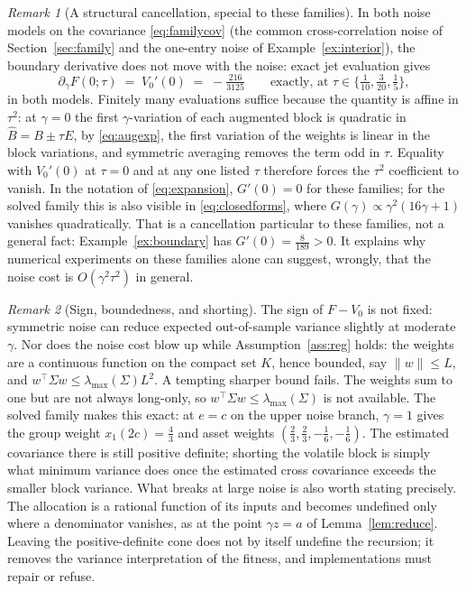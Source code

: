 \documentclass[11pt]{article}
\theoremstyle{remark}
\newtheorem{remark}{Remark}
\begin{document}
\begin{remark}[A structural cancellation, special to these families]
\label{rem:cancel}
In both noise models on the covariance \eqref{eq:familycov} (the common
cross-correlation noise of Section~\ref{sec:family} and the one-entry noise
of Example~\ref{ex:interior}), the boundary derivative does not move with
the noise: exact jet evaluation gives
\[
  \partial_\gamma F(0;\tau) \;=\; V_0'(0) \;=\; -\tfrac{216}{3125}
  \qquad\text{exactly, at } \tau \in \{\tfrac{1}{10}, \tfrac{3}{20},
  \tfrac15\},
\]
in both models. Finitely many evaluations suffice because the quantity is
affine in $\tau^2$: at $\gamma = 0$ the first $\gamma$-variation of each
augmented block is quadratic in $\widehat B = B \pm \tau E$, by
\eqref{eq:augexp}, the first variation of the weights is linear in the
block variations, and symmetric averaging removes the term odd in $\tau$.
Equality with $V_0'(0)$ at $\tau = 0$ and at any one listed $\tau$
therefore forces the $\tau^2$ coefficient to vanish. In the notation of
\eqref{eq:expansion}, $G'(0) = 0$ for
these families; for the solved family this is also visible in
\eqref{eq:closedforms}, where $G(\gamma) \propto \gamma^2(16\gamma+1)$
vanishes quadratically. That is a cancellation particular to these
families, not a general fact: Example~\ref{ex:boundary} has
$G'(0) = \tfrac{8}{189} > 0$. It explains why numerical experiments on
these families alone can suggest, wrongly, that the noise cost is
$O(\gamma^2\tau^2)$ in general.
\end{remark}

\begin{remark}[Sign, boundedness, and shorting]
\label{rem:bounded}
The sign of $F - V_0$ is not fixed: symmetric noise can reduce expected
out-of-sample variance slightly at moderate $\gamma$. Nor does the noise
cost blow up while Assumption~\ref{ass:reg} holds: the weights are a
continuous function on the compact set $K$, hence bounded, say
$\|w\| \le L$, and $w^\top \Sigma w \le \lambda_{\max}(\Sigma) L^2$. A
tempting sharper bound fails. The weights sum to one but are not always
long-only, so $w^\top \Sigma w \le \lambda_{\max}(\Sigma)$ is not
available. The solved family makes this exact: at $e = c$ on the upper
noise branch, $\gamma = 1$ gives the group weight $x_1(2c) = \tfrac43$ and
asset weights $(\tfrac23, \tfrac23, -\tfrac16, -\tfrac16)$. The estimated
covariance there is still positive definite; shorting the volatile block is
simply what minimum variance does once the estimated cross covariance
exceeds the smaller block variance. What breaks at large noise is also
worth stating precisely. The allocation is a rational function of its
inputs and becomes undefined only where a denominator vanishes, as at the
point $\gamma z = a$ of Lemma~\ref{lem:reduce}. Leaving the
positive-definite cone does not by itself undefine the recursion; it
removes the variance interpretation of the fitness, and implementations
must repair or refuse.
\end{remark}
\end{document}
